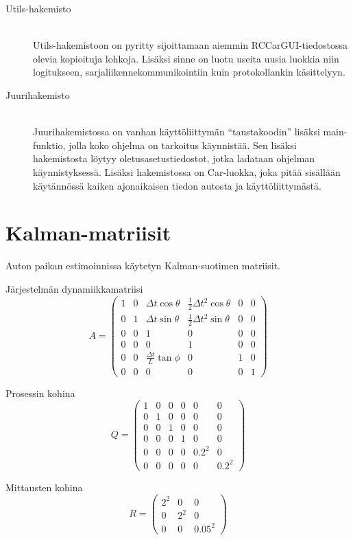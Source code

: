 \documentclass{article}
\begin{document}
\begin{appendices}
\begin{description}
\item[Utils-hakemisto] \hfill \\
	Utils-hakemistoon on pyritty sijoittamaan aiemmin RCCarGUI-tiedostossa olevia kopioituja lohkoja. Lisäksi sinne on luotu useita uusia luokkia niin logitukseen, sarjaliikennekommunikointiin kuin protokollankin käsittelyyn.

\item[Juurihakemisto] \hfill \\
	Juurihakemistossa on vanhan käyttöliittymän ``taustakoodin'' lisäksi main-funktio, jolla koko ohjelma on tarkoitus käynnistää. Sen lisäksi hakemistosta löytyy oletusasetustiedostot, jotka ladataan ohjelman käynnistyksessä. Lisäksi hakemistossa on Car-luokka, joka pitää sisällään käytännössä kaiken ajonaikaisen tiedon autosta ja käyttöliittymästä.
\end{description}

\section{Kalman-matriisit} \label{app:kalman}

Auton paikan estimoinnissa käytetyn Kalman-suotimen matriisit.

Järjestelmän dynamiikkamatriisi
\[
A =
\begin{pmatrix}
1 & 0 & \Delta{t}\cos{\theta} & \frac{1}{2}\Delta{t}^{2} \cos{\theta} & 0 & 0 \\
0 & 1 & \Delta{t}\sin{\theta} & \frac{1}{2}\Delta{t}^{2} \sin{\theta} & 0 & 0 \\
0 & 0 & 1 & 0 & 0 & 0 \\
0 & 0 & 0 & 1 & 0 & 0 \\
0 & 0 & \frac{\Delta{t}}{L} \tan{\phi} & 0 & 1 & 0 \\
0 & 0 & 0 & 0 & 0 & 1
\end{pmatrix}
\]

Prosessin kohina
\[
Q =
\begin{pmatrix}
1 & 0 & 0 & 0 & 0 & 0 \\
0 & 1 & 0 & 0 & 0 & 0 \\
0 & 0 & 1 & 0 & 0 & 0 \\
0 & 0 & 0 & 1 & 0 & 0 \\
0 & 0 & 0 & 0 & 0.2^2 & 0 \\
0 & 0 & 0 & 0 & 0 & 0.2^2
\end{pmatrix}
\]

Mittausten kohina
\[
R =
\begin{pmatrix}
2^2 & 0 & 0 \\
0 & 2^2 & 0 \\
0 & 0 & 0.05^2
\end{pmatrix}
\]


\end{appendices}
\end{document}
